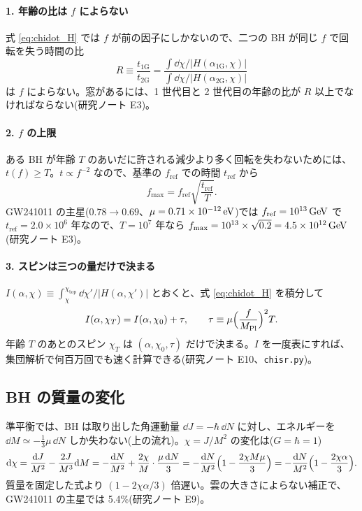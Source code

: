 \paragraph{1. 年齢の比は $f$ によらない}
式 \eqref{eq:chidot_H} では $f$ が前の因子にしかないので、二つの BH が同じ $f$ で回転を失う時間の比
\begin{equation}
R\equiv\frac{t_\mathrm{1G}}{t_\mathrm{2G}}=\frac{\int\dd\chi/|H(\alpha_\mathrm{1G},\chi)|}{\int\dd\chi/|H(\alpha_\mathrm{2G},\chi)|}
\end{equation}
は $f$ によらない。窓があるには、1 世代目と 2 世代目の年齢の比が $R$ 以上でなければならない(研究ノート E3)。

\paragraph{2. $f$ の上限}
ある BH が年齢 $T$ のあいだに許される減少より多く回転を失わないためには、$t(f)\ge T$。$t\propto f^{-2}$ なので、基準の $f_\mathrm{ref}$ での時間 $t_\mathrm{ref}$ から
\begin{equation}
f_\mathrm{max}=f_\mathrm{ref}\sqrt{\frac{t_\mathrm{ref}}{T}}.
\label{eq:fmax}
\end{equation}
GW241011 の主星($0.78\to0.69$、$\mu=0.71\times10^{-12}\,\mathrm{eV}$)では $f_\mathrm{ref}=10^{13}\,\mathrm{GeV}$ で $t_\mathrm{ref}=2.0\times10^6$ 年なので、$T=10^7$ 年なら $f_\mathrm{max}=10^{13}\times\sqrt{0.2}=4.5\times10^{12}\,\mathrm{GeV}$(研究ノート E3)。

\paragraph{3. スピンは三つの量だけで決まる}
$I(\alpha,\chi)\equiv\int_\chi^{\chi_\mathrm{top}}\dd\chi'/|H(\alpha,\chi')|$ とおくと、式 \eqref{eq:chidot_H} を積分して
\begin{equation}
I(\alpha,\chi_T)=I(\alpha,\chi_0)+\tau,\qquad \tau\equiv\mu\Bigl(\frac{f}{M_\mathrm{Pl}}\Bigr)^2T.
\end{equation}
年齢 $T$ のあとのスピン $\chi_T$ は $(\alpha,\chi_0,\tau)$ だけで決まる。$I$ を一度表にすれば、集団解析で何百万回でも速く計算できる(研究ノート E10、\texttt{chisr.py})。

\subsection{BH の質量の変化}

準平衡では、BH は取り出した角運動量 $\dd J=-\hbar\,\dd N$ に対し、エネルギーを $\dd M\simeq-\tfrac13\mu\,\dd N$ しか失わない(上の流れ)。$\chi=J/M^2$ の変化は($G=\hbar=1$)
\begin{equation}
\mathrm{d}\chi=\frac{\mathrm{d} J}{M^2}-\frac{2J}{M^3}\mathrm{d} M=-\frac{\mathrm{d} N}{M^2}+\frac{2\chi}{M}\cdot\frac{\mu\,\mathrm{d} N}{3}
=-\frac{\mathrm{d} N}{M^2}\Bigl(1-\frac{2\chi M\mu}{3}\Bigr)=-\frac{\mathrm{d} N}{M^2}\Bigl(1-\frac{2\chi\alpha}{3}\Bigr).
\end{equation}
質量を固定した式より $(1-2\chi\alpha/3)$ 倍遅い。雲の大きさによらない補正で、GW241011 の主星では 5.4\%(研究ノート E9)。

